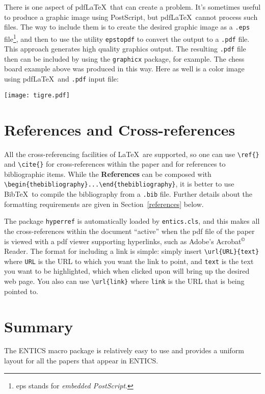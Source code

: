 \documentclass[twoside,11pt]{entics}
\begin{document}
There is one aspect of pdf\LaTeX\ that can create a problem. It's sometimes
useful to produce a graphic image using PostScript, but pdf\LaTeX\ cannot
process such files. The way to include them is to create the desired graphic
image as a \verb+.eps+ file\footnote{eps stands for \emph{embedded
    PostScript}.}, and then to use the utility \verb+epstopdf+ to convert the
output to a \verb+.pdf+ file. This approach generates high quality graphics
output. The resulting \verb+.pdf+ file then can be included by using the
\verb+graphicx+ package, for example. The chess board example above was
produced in this way. Here as well is a color image using pdf\LaTeX\ and
\verb+.pdf+ input file:\\
\begin{center}
  \texttt{[image: tigre.pdf]}
\end{center}

\section{References and Cross-references}
All the cross-referencing facilities of \LaTeX\ are supported, so one can use
\verb+\ref{}+ and \verb+\cite{}+ for cross-references within the paper and for
references to bibliographic items. While the \textbf{References} can be
composed with \verb+\begin{thebibliography}...\end{thebibliography}+, it is
better to use Bib\TeX\ to compile the bibliography from a \verb+.bib+ file.
Further details about the formatting requirements are given in
Section~\ref{references} below.

The package \texttt{hyperref} is automatically loaded by \texttt{entics.cls},
and this makes all the cross-references within the document ``active'' when the
pdf file of the paper is viewed with a pdf viewer supporting hyperlinks, such
as Adobe's Acrobat$^{\tiny \copyright}$ Reader. The format for including a link
is simple: simply insert \verb+\url{URL}{text}+ where \texttt{URL} is the URL
to which you want the link to point, and \texttt{text} is the text you want to
be highlighted, which when clicked upon will bring up the desired web page. You
also can use \verb+\url{link}+ where \texttt{link} is the URL that is being
pointed to.

\section{Summary}  The ENTICS macro package is relatively easy to use and provides a uniform
layout for all the papers that appear in ENTICS.
\end{document}
